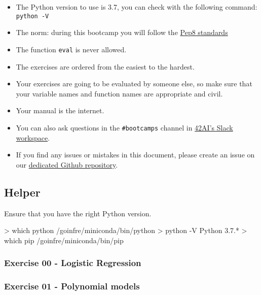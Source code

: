 \documentclass[]{article}
\newenvironment{Shaded}{\begin{snugshade}}{\end{snugshade}}
\newcommand{\NormalTok}[1]{\textcolor[rgb]{0.81,0.81,0.76}{#1}}
\begin{document}
\begin{itemize}
\item
  The Python version to use is 3.7, you can check with the following
  command: \texttt{python\ -V}
\item
  The norm: during this bootcamp you will follow the
  \href{https://www.python.org/dev/peps/pep-0008/}{Pep8 standards}
\item
  The function \texttt{eval} is never allowed.
\item
  The exercises are ordered from the easiest to the hardest.
\item
  Your exercises are going to be evaluated by someone else, so make sure
  that your variable names and function names are appropriate and civil.
\item
  Your manual is the internet.
\item
  You can also ask questions in the \texttt{\#bootcamps} channel in
  \href{https://42-ai.slack.com}{42AI's Slack workspace}.
\item
  If you find any issues or mistakes in this document, please create an
  issue on our
  \href{https://github.com/42-AI/bootcamp_machine-learning/issues}{dedicated
  Github repository}.
\end{itemize}

\hypertarget{helper}{%
\subsection{Helper}\label{helper}}

Ensure that you have the right Python version.

\begin{Shaded}
\begin{Highlighting}[]
\NormalTok{> which python}
\NormalTok{/goinfre/miniconda/bin/python}
\NormalTok{> python -V}
\NormalTok{Python 3.7.*}
\NormalTok{> which pip}
\NormalTok{/goinfre/miniconda/bin/pip}
\end{Highlighting}
\end{Shaded}

\hypertarget{exercise-00---logistic-regression}{%
\subsubsection{Exercise 00 - Logistic
Regression}\label{exercise-00---logistic-regression}}

\hypertarget{exercise-01---polynomial-models}{%
\subsubsection{Exercise 01 - Polynomial
models}\label{exercise-01---polynomial-models}}
\end{document}
